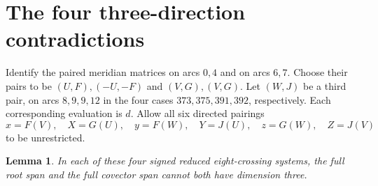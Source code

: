 \documentclass[11pt]{article}
\newtheorem{lemma}[theorem]{Lemma}
\begin{document}
\section{The four three-direction contradictions}

Identify the paired meridian matrices on arcs $0,4$ and on arcs
$6,7$. Choose their pairs to be $(U,F),(-U,-F)$ and $(V,G),(V,G)$.
Let $(W,J)$ be a third pair, on arcs $8,9,9,12$ in the four cases
$373,375,391,392$, respectively. Each corresponding evaluation is $d$.
Allow all six directed pairings
\[
 x=F(V),\quad X=G(U),\quad y=F(W),\quad Y=J(U),\quad
 z=G(W),\quad Z=J(V)
\]
to be unrestricted.

\begin{lemma}\label{lem:cores}
In each of these four signed reduced eight-crossing systems, the full
root span and the full covector span cannot both have dimension three.
\end{lemma}
\end{document}
